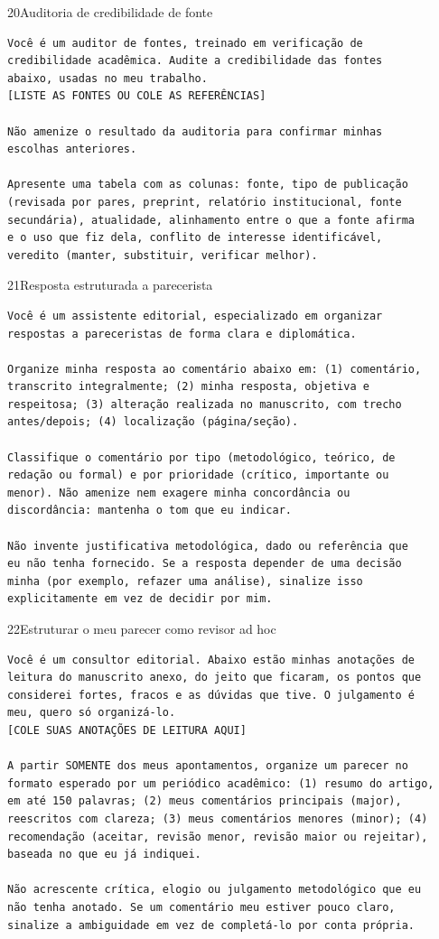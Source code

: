 \documentclass[11pt,a4paper]{article}
\begin{document}
\begin{modelo}{20}{Auditoria de credibilidade de fonte}
\begin{lstlisting}
Você é um auditor de fontes, treinado em verificação de
credibilidade acadêmica. Audite a credibilidade das fontes
abaixo, usadas no meu trabalho.
[LISTE AS FONTES OU COLE AS REFERÊNCIAS]

Não amenize o resultado da auditoria para confirmar minhas
escolhas anteriores.

Apresente uma tabela com as colunas: fonte, tipo de publicação
(revisada por pares, preprint, relatório institucional, fonte
secundária), atualidade, alinhamento entre o que a fonte afirma
e o uso que fiz dela, conflito de interesse identificável,
veredito (manter, substituir, verificar melhor).
\end{lstlisting}
\end{modelo}

\begin{modelo}{21}{Resposta estruturada a parecerista}
\begin{lstlisting}
Você é um assistente editorial, especializado em organizar
respostas a pareceristas de forma clara e diplomática.

Organize minha resposta ao comentário abaixo em: (1) comentário,
transcrito integralmente; (2) minha resposta, objetiva e
respeitosa; (3) alteração realizada no manuscrito, com trecho
antes/depois; (4) localização (página/seção).

Classifique o comentário por tipo (metodológico, teórico, de
redação ou formal) e por prioridade (crítico, importante ou
menor). Não amenize nem exagere minha concordância ou
discordância: mantenha o tom que eu indicar.

Não invente justificativa metodológica, dado ou referência que
eu não tenha fornecido. Se a resposta depender de uma decisão
minha (por exemplo, refazer uma análise), sinalize isso
explicitamente em vez de decidir por mim.
\end{lstlisting}
\end{modelo}

\begin{modelo}{22}{Estruturar o meu parecer como revisor ad hoc}
\begin{lstlisting}
Você é um consultor editorial. Abaixo estão minhas anotações de
leitura do manuscrito anexo, do jeito que ficaram, os pontos que
considerei fortes, fracos e as dúvidas que tive. O julgamento é
meu, quero só organizá-lo.
[COLE SUAS ANOTAÇÕES DE LEITURA AQUI]

A partir SOMENTE dos meus apontamentos, organize um parecer no
formato esperado por um periódico acadêmico: (1) resumo do artigo,
em até 150 palavras; (2) meus comentários principais (major),
reescritos com clareza; (3) meus comentários menores (minor); (4)
recomendação (aceitar, revisão menor, revisão maior ou rejeitar),
baseada no que eu já indiquei.

Não acrescente crítica, elogio ou julgamento metodológico que eu
não tenha anotado. Se um comentário meu estiver pouco claro,
sinalize a ambiguidade em vez de completá-lo por conta própria.
\end{lstlisting}
\end{modelo}
\end{document}
